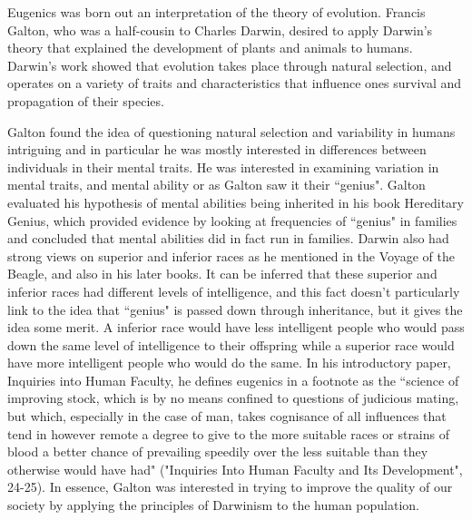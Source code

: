 \documentclass[11pt, oneside]{article}
\begin{document}
\par 
Eugenics was born out an interpretation of the theory of evolution. Francis Galton, who was a half-cousin to Charles Darwin, desired to apply Darwin's theory that explained the development of plants and animals to humans. Darwin's work showed that evolution takes place through natural selection, and operates on a variety of traits and characteristics that influence ones survival and propagation of their species. 
\par Galton found the idea of questioning natural selection and variability in humans intriguing and in particular he was mostly interested in differences between individuals in their mental traits. He was interested in examining variation in mental traits, and mental ability or as Galton saw it their ``genius". Galton evaluated his hypothesis of mental abilities being inherited in his book Hereditary Genius, which provided evidence by looking at frequencies of ``genius" in families and concluded that mental abilities did in fact run in families. Darwin also had strong views on superior and inferior races as he mentioned in the Voyage of the Beagle, and also in his later books. It can be inferred that these superior and inferior races had different levels of intelligence, and this fact doesn't particularly link to the idea that ``genius" is passed down through inheritance, but it gives the idea some merit. A inferior race would have less intelligent people who would pass down the same level of intelligence to their offspring while a superior race would have more intelligent people who would do the same. 
In his introductory paper, Inquiries into Human Faculty, he defines eugenics in a footnote as the ``science of improving stock, which is by no means confined to questions of judicious mating, but which, especially in the case of man, takes cognisance of all influences that tend in however remote a degree to give to the more suitable races or strains of blood a better chance of prevailing speedily over the less suitable than they otherwise would have had" ("Inquiries Into Human Faculty and Its Development", 24-25). In essence, Galton was interested in trying to improve the quality of our society by applying the principles of Darwinism to the human population. 


\end{document}
